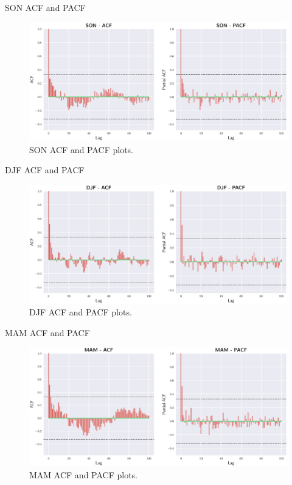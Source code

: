 \documentclass[10pt]{beamer}
\begin{document}
\begin{frame}{SON ACF and PACF}
	\begin{figure}[htbp]
		\centering
		\includegraphics[scale=0.37]{son_acf}
		\caption{SON ACF and PACF plots.}
	\end{figure}
\end{frame}

\begin{frame}{DJF ACF and PACF}
	\begin{figure}[htbp]
		\centering
		\includegraphics[scale=0.37]{djf_acf}
		\caption{DJF ACF and PACF plots.}
	\end{figure}
\end{frame}

\begin{frame}{MAM ACF and PACF}
	\begin{figure}[htbp]
		\centering
		\includegraphics[scale=0.37]{mam_acf}
		\caption{MAM ACF and PACF plots.}
	\end{figure}
\end{frame}
\end{document}
